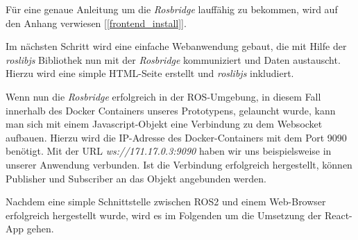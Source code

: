 \begin{flushleft}
Für eine genaue Anleitung um die \textit{Rosbridge} lauffähig zu bekommen, wird auf den Anhang verwiesen [\ref{frontend_install}].

Im nächsten Schritt wird eine einfache Webanwendung gebaut, die mit Hilfe der \textit{roslibjs} Bibliothek nun mit der \textit{Rosbridge} kommuniziert und Daten austauscht. 
Hierzu wird eine simple HTML-Seite erstellt und \textit{roslibjs} inkludiert. 




Wenn nun die \textit{Rosbridge} erfolgreich in der ROS-Umgebung, in diesem Fall innerhalb des Docker Containers unseres Prototypens, gelauncht wurde, kann man sich mit einem Javascript-Objekt eine Verbindung zu dem Websocket aufbauen.
Hierzu wird die IP-Adresse des Docker-Containers mit dem Port 9090 benötigt.
Mit der URL \textit{ws://171.17.0.3:9090} haben wir uns beispielsweise in unserer Anwendung verbunden.
Ist die Verbindung erfolgreich hergestellt, können Publisher und Subscriber an das Objekt angebunden werden.

Nachdem eine simple Schnittstelle zwischen ROS2 und einem Web-Browser erfolgreich hergestellt wurde, wird es im Folgenden um die Umsetzung der React-App gehen. 




\end{flushleft}